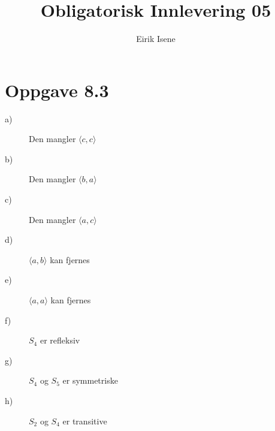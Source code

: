 \documentclass[norsk, 12p]{article}
\title{Obligatorisk Innlevering 05}
\author{Eirik Isene}
\begin{document}
\maketitle

\section{Oppgave 8.3}
\begin{description}
\item[a)] Den mangler $\langle c,c\rangle$
\item[b)] Den mangler $\langle b,a\rangle$
\item[c)] Den mangler $\langle a,c\rangle$
\item[d)] $\langle a,b\rangle$ kan fjernes
\item[e)] $\langle a,a\rangle$ kan fjernes
\item[f)] $S_4$ er refleksiv
\item[g)] $S_4$ og $S_5$ er symmetriske
\item[h)] $S_2$ og $S_4$ er transitive
\end{description}
\end{document}

